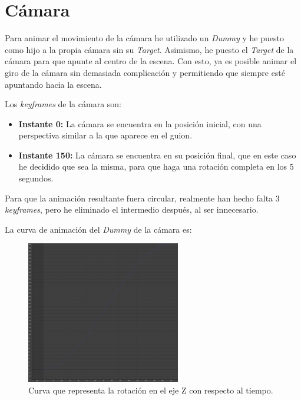 \section{Cámara}
Para animar el movimiento de la cámara he utilizado un \textit{Dummy} y he puesto como hijo a la propia cámara sin su \textit{Target}. Asimismo, he puesto el \textit{Target} de la cámara para que apunte al centro de la escena. Con esto, ya es posible animar el giro de la cámara sin demasiada complicación y permitiendo que siempre esté apuntando hacia la escena.

\bigskip

Los \textit{keyframes} de la cámara son:

\begin{itemize}
   \item \textbf{Instante 0: }La cámara se encuentra en la posición inicial, con una perspectiva similar a la que aparece en el guion.
   \item \textbf{Instante 150: }La cámara se encuentra en su posición final, que en este caso he decidido que sea la misma, para que haga una rotación completa en los 5 segundos.
\end{itemize}

\bigskip

Para que la animación resultante fuera circular, realmente han hecho falta 3 \textit{keyframes}, pero he eliminado el intermedio después, al ser innecesario.

\bigskip

La curva de animación del \textit{Dummy} de la cámara es:

\begin{figure}[H]
   \centering
   \includegraphics[width=0.6\textwidth]{imagenes/curvas/Camara/blue.png}
   \caption{Curva que representa la rotación en el eje Z con respecto al tiempo.}
\end{figure}

